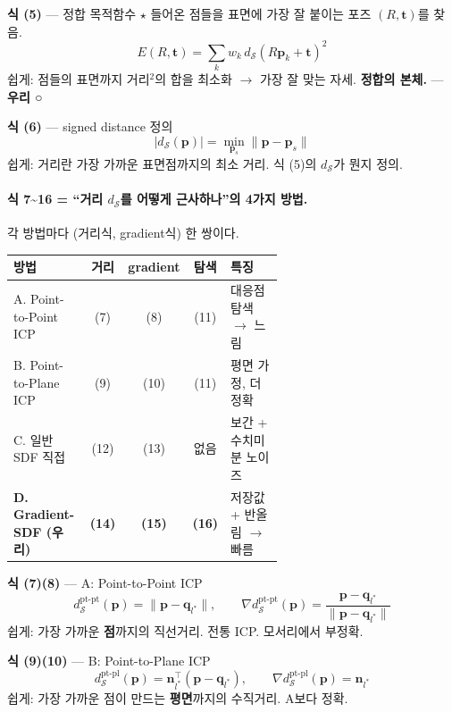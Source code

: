 \textbf{식 (5)} --- 정합 목적함수 $\star$ \quad 들어온 점들을 표면에 가장 잘
붙이는 포즈 $(R,\mathbf{t})$를 찾음.
\begin{equation*}
  E(R,\mathbf{t}) = \sum_k w_k\,d_{\mathcal{S}}(R\mathbf{p}_k + \mathbf{t})^2
  \tag{5}
\end{equation*}
쉽게: 점들의 표면까지 거리$^2$의 합을 최소화 $\to$ 가장 잘 맞는 자세.
\textbf{정합의 본체.} --- \textbf{우리 ○}

\textbf{식 (6)} --- signed distance 정의
\begin{equation*}
  \lvert d_{\mathcal{S}}(\mathbf{p})\rvert
  = \min_{\mathbf{p}_s}\lVert \mathbf{p}-\mathbf{p}_s\rVert
  \tag{6}
\end{equation*}
쉽게: 거리란 가장 가까운 표면점까지의 최소 거리. 식 (5)의 $d_{\mathcal{S}}$가
뭔지 정의.

\paragraph{식 7\textasciitilde 16 = ``거리 $d_{\mathcal{S}}$를 어떻게
근사하나''의 4가지 방법.} 각 방법마다 (거리식, gradient식) 한 쌍이다.

\begin{longtable}{p{0.30\linewidth}cccp{0.30\linewidth}}
\toprule
\textbf{방법} & \textbf{거리} & \textbf{gradient} & \textbf{탐색} &
\textbf{특징} \\
\midrule
A. Point-to-Point ICP & (7) & (8) & (11) & 대응점 탐색 $\to$ 느림 \\
B. Point-to-Plane ICP & (9) & (10) & (11) & 평면 가정, 더 정확 \\
C. 일반 SDF 직접 & (12) & (13) & 없음 & 보간 + 수치미분 노이즈 \\
\textbf{D. Gradient-SDF (우리)} & \textbf{(14)} & \textbf{(15)} &
\textbf{(16)} & 저장값 + 반올림 $\to$ 빠름 \\
\bottomrule
\end{longtable}

\textbf{식 (7)(8)} --- A: Point-to-Point ICP
\begin{equation*}
  d_{\mathcal{S}}^{\text{pt-pt}}(\mathbf{p})
    = \lVert \mathbf{p}-\mathbf{q}_{l^*}\rVert, \qquad
  \nabla d_{\mathcal{S}}^{\text{pt-pt}}(\mathbf{p})
    = \frac{\mathbf{p}-\mathbf{q}_{l^*}}{\lVert \mathbf{p}-\mathbf{q}_{l^*}\rVert}
  \tag{7, 8}
\end{equation*}
쉽게: 가장 가까운 \textbf{점}까지의 직선거리. 전통 ICP. 모서리에서 부정확.

\textbf{식 (9)(10)} --- B: Point-to-Plane ICP
\begin{equation*}
  d_{\mathcal{S}}^{\text{pt-pl}}(\mathbf{p})
    = \mathbf{n}_{l^*}^{\top}(\mathbf{p}-\mathbf{q}_{l^*}), \qquad
  \nabla d_{\mathcal{S}}^{\text{pt-pl}}(\mathbf{p}) = \mathbf{n}_{l^*}
  \tag{9, 10}
\end{equation*}
쉽게: 가장 가까운 점이 만드는 \textbf{평면}까지의 수직거리. A보다 정확.

